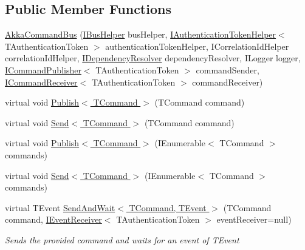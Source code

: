 \subsection*{Public Member Functions}
\begin{DoxyCompactItemize}
\item 
\hyperlink{classCqrs_1_1Akka_1_1Commands_1_1AkkaCommandBus_a765b65e299cc1b32c4c0e7ee405c473d}{Akka\+Command\+Bus} (\hyperlink{interfaceCqrs_1_1Bus_1_1IBusHelper}{I\+Bus\+Helper} bus\+Helper, \hyperlink{interfaceCqrs_1_1Authentication_1_1IAuthenticationTokenHelper}{I\+Authentication\+Token\+Helper}$<$ T\+Authentication\+Token $>$ authentication\+Token\+Helper, I\+Correlation\+Id\+Helper correlation\+Id\+Helper, \hyperlink{interfaceCqrs_1_1Configuration_1_1IDependencyResolver}{I\+Dependency\+Resolver} dependency\+Resolver, I\+Logger logger, \hyperlink{interfaceCqrs_1_1Commands_1_1ICommandPublisher}{I\+Command\+Publisher}$<$ T\+Authentication\+Token $>$ command\+Sender, \hyperlink{interfaceCqrs_1_1Commands_1_1ICommandReceiver}{I\+Command\+Receiver}$<$ T\+Authentication\+Token $>$ command\+Receiver)
\item 
virtual void \hyperlink{classCqrs_1_1Akka_1_1Commands_1_1AkkaCommandBus_a48e1d46035b1e1a3251636b8a03f7dae}{Publish$<$ T\+Command $>$} (T\+Command command)
\item 
virtual void \hyperlink{classCqrs_1_1Akka_1_1Commands_1_1AkkaCommandBus_a696f471533265685f80922e39727288e}{Send$<$ T\+Command $>$} (T\+Command command)
\item 
virtual void \hyperlink{classCqrs_1_1Akka_1_1Commands_1_1AkkaCommandBus_ab52365375febd74ac078e97af6e6cd24}{Publish$<$ T\+Command $>$} (I\+Enumerable$<$ T\+Command $>$ commands)
\item 
virtual void \hyperlink{classCqrs_1_1Akka_1_1Commands_1_1AkkaCommandBus_a06b7b148493c67d79aaf6b7d59afa487}{Send$<$ T\+Command $>$} (I\+Enumerable$<$ T\+Command $>$ commands)
\item 
virtual T\+Event \hyperlink{classCqrs_1_1Akka_1_1Commands_1_1AkkaCommandBus_a10ed94fc318977777e2e6cc970b8953e}{Send\+And\+Wait$<$ T\+Command, T\+Event $>$} (T\+Command command, \hyperlink{interfaceCqrs_1_1Events_1_1IEventReceiver}{I\+Event\+Receiver}$<$ T\+Authentication\+Token $>$ event\+Receiver=null)
\begin{DoxyCompactList}\small\item\em Sends the provided {\itshape command}  and waits for an event of {\itshape T\+Event}  \end{DoxyCompactList}\item 

\end{DoxyCompactItemize}
